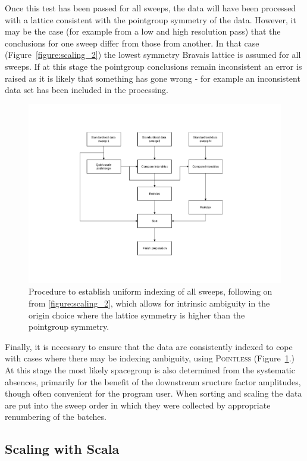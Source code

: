 \documentclass[preprint,pdf]{iucr}
\begin{document}
Once this test has been passed for all sweeps, the data will have been
processed with a lattice consistent with the pointgroup symmetry of
the data. However, it may be the case (for example from a low and high
resolution pass) that the conclusions for one sweep differ from those
from another. In that case (Figure~\ref{figure:scaling_2}) the lowest
symmetry Bravais lattice
is assumed for all sweeps. If at this stage the pointgroup
conclusions remain inconsistent an error is raised as it is likely
that something has gone wrong - for example an inconsistent data set
has been included in the processing. 

\begin{figure}
\caption{Procedure to establish uniform indexing of all sweeps,
following on from \ref{figure:scaling_2}, which allows for intrinsic
ambiguity in the origin choice where the lattice symmetry is higher
than the pointgroup symmetry.
\label{figure:scaling_3}}
\centering
\includegraphics[scale=0.5]{figures/scaling-step-3.pdf}
\end{figure}

Finally, it is necessary to ensure that the data are consistently
indexed to cope with cases where there may be indexing ambiguity,
using \textsc{Pointless} (Figure~\ref{figure:scaling_3}.) At this stage the
most likely
spacegroup is also determined from the systematic absences, primarily
for the benefit of the downstream sructure factor amplitudes, though
often convenient for the program user. When sorting and scaling the
data are put into the sweep order in which they were collected by
appropriate renumbering of the batches.

\subsection{Scaling with Scala}
\end{document}
